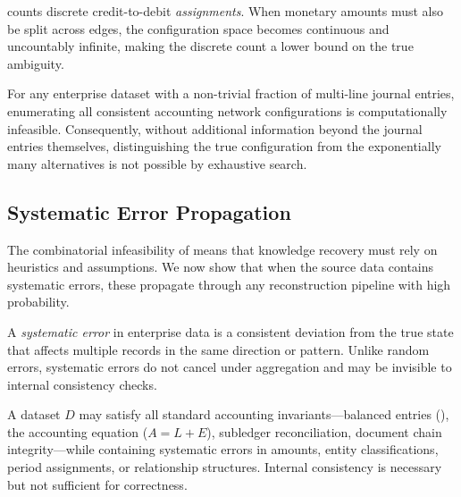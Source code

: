 \begin{remark}
 counts discrete credit-to-debit
\emph{assignments}.  When monetary amounts must also be split across
edges, the configuration space becomes continuous and uncountably
infinite, making the discrete count a lower bound on the true
ambiguity.
\end{remark}

\begin{corollary}
\label{cor:verification}
For any enterprise dataset with a non-trivial fraction of multi-line
journal entries, enumerating all consistent accounting network
configurations is computationally infeasible.  Consequently, without
additional information beyond the journal entries themselves,
distinguishing the true configuration from the exponentially many
alternatives is not possible by exhaustive search.
\end{corollary}

\subsection{Systematic Error Propagation}
\label{sec:gt_errors}

The combinatorial infeasibility of  means that
knowledge recovery must rely on heuristics and assumptions.  We now show
that when the source data contains systematic errors, these propagate
through any reconstruction pipeline with high probability.

\begin{definition}
\label{def:systematic_error}
A \emph{systematic error} in enterprise data is a consistent
deviation from the true state that affects multiple records in the same
direction or pattern.  Unlike random errors, systematic errors do not
cancel under aggregation and may be invisible to internal consistency
checks.
\end{definition}

\begin{observation}
\label{obs:consistency}
A dataset $D$ may satisfy all standard accounting invariants---balanced
entries (), the accounting equation ($A = L + E$),
subledger reconciliation, document chain integrity---while containing
systematic errors in amounts, entity classifications, period
assignments, or relationship structures.  Internal consistency is
necessary but not sufficient for correctness.
\end{observation}

